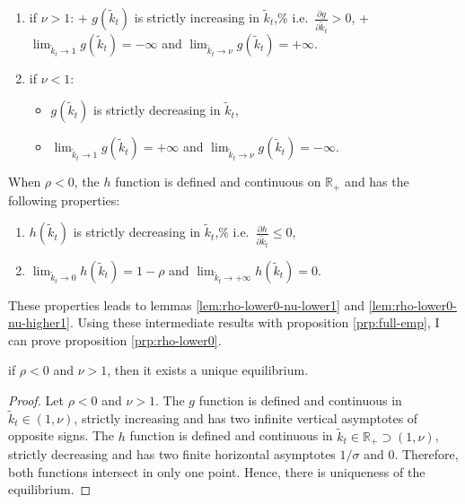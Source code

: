 \documentclass[
]{article}
\providecommand{\tightlist}{%
  \setlength{\itemsep}{0pt}\setlength{\parskip}{0pt}}
\let\BeginKnitrBlock\begin \let\EndKnitrBlock\end
\begin{document}
\begin{enumerate}
\def\labelenumi{\arabic{enumi}.}
\tightlist
\item
  if \(\nu > 1\):
  + \(g(\tilde{k}_t)\) is strictly increasing in \(\tilde{k}_t\),\% i.e.~\(\frac{\partial g}{\partial \tilde{k}_t} > 0\),
  + \(\lim_{\tilde{k}_t\to 1} g(\tilde{k}_t) = -\infty\) and \(\lim_{\tilde{k}_t\to \nu} g(\tilde{k}_t) = +\infty\).
\item
  if \(\nu < 1\):

  \begin{itemize}
  \tightlist
  \item
    \(g(\tilde{k}_t)\) is strictly decreasing in \(\tilde{k}_t\),
  \item
    \(\lim_{\tilde{k}_t\to 1} g(\tilde{k}_t) = +\infty\) and \(\lim_{\tilde{k}_t\to \nu} g(\tilde{k}_t) = -\infty\).
  \end{itemize}
\end{enumerate}

When \(\rho<0\), the \(h\) function is defined and continuous on \(\mathbb{R}_+\) and has the following properties:

\begin{enumerate}
\def\labelenumi{\arabic{enumi}.}
\tightlist
\item
  \(h(\tilde{k}_t)\) is strictly decreasing in \(\tilde{k}_t\),\% i.e.~\(\frac{\partial h}{\partial \tilde{k}_t} \leq 0\),
\item
  \(\lim_{\tilde{k}_t\to 0} h(\tilde{k}_t) = 1-\rho\) and \(\lim_{\tilde{k}_t\to +\infty} h(\tilde{k}_t) = 0\).
\end{enumerate}

These properties leads to lemmas \ref{lem:rho-lower0-nu-lower1} and \ref{lem:rho-lower0-nu-higher1}. Using these intermediate results with proposition \ref{prp:full-emp}, I can prove proposition \ref{prp:rho-lower0}.

\BeginKnitrBlock{lemma}
\protect\hypertarget{lem:rho-lower0-nu-lower1}{}{\label{lem:rho-lower0-nu-lower1} } if \(\rho < 0\) and \(\nu > 1\), then it exists a unique equilibrium.
\EndKnitrBlock{lemma}

\BeginKnitrBlock{proof}
\iffalse{} {Proof. } \fi{} Let \(\rho < 0\) and \(\nu > 1\). The \(g\) function is defined and continuous in \(\tilde{k}_t \in \left(1, \nu \right)\), strictly increasing and has two infinite vertical asymptotes of opposite signs. The \(h\) function is defined and continuous in \(\tilde{k}_t \in \mathbb{R}_+ \supset \left(1, \nu \right)\), strictly decreasing and has two finite horizontal asymptotes \(1/\sigma\) and \(0\). Therefore, both functions intersect in only one point. Hence, there is uniqueness of the equilibrium.
\EndKnitrBlock{proof}
\end{document}
